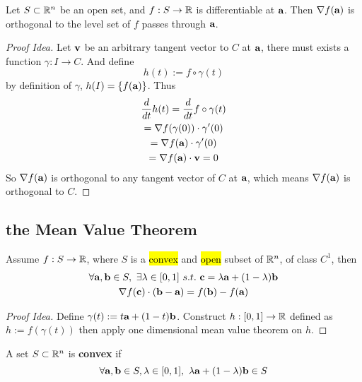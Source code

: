 \documentclass[11pt]{article}
\newcommand{\vea}[0]{\ve{a}}
\newcommand{\veb}[0]{\ve{b}}
\begin{document}
			\begin{theorem}
				Let $S \subset \mathbb{R}^n$ be an open set, and $f: S \to \mathbb{R}$ is differentiable at $\vea$. Then $\nabla f(\vea)$ is orthogonal to the level set of $f$ passes through $\vea$.
				\begin{proof}[Proof Idea]
					Let $\textbf{v}$ be an arbitrary tangent vector to $C$ at $\vea$, there must exists a function $\gamma: I \to C$. And define 
					\begin{equation}
						h(t) := f \circ \gamma (t)
					\end{equation}
					by definition of $\gamma$, $h(I) = \{f(\vea)\}$. Thus
					\begin{gather}
						\frac{d}{dt}h(t) = \frac{d}{dt} f \circ \gamma (t) \\
						= \nabla f (\gamma(0)) \cdot \gamma'(0) \\
						= \nabla f(\vea) \cdot \gamma'(0) \\
						= \nabla f(\vea) \cdot \ve{v} = 0
					\end{gather}
					So $\nabla f(\vea)$ is orthogonal to any tangent vector of $C$ at $\vea$, which means $\nabla f(\vea)$ is orthogonal to $C$.
				\end{proof}
			\end{theorem}
			
			
		\subsection{the Mean Value Theorem}
			\begin{theorem}
				Assume $f: S \to \mathbb{R}$, where $S$ is a \hl{convex} and \hl{open} subset of $\mathbb{R}^n$, of class $C^1$, then
				\begin{gather}
					\forall \vea, \veb \in S,\ \exists \lambda \in [0, 1]\ s.t.\ \ve{c} = \lambda \vea + (1 - \lambda) \veb \\
					\nabla f(\ve{c}) \cdot (\veb - \vea) = f(\veb) - f(\vea)
				\end{gather}
				\begin{proof}[Proof Idea]
					Define $\gamma(t) := t \vea + (1-t)\veb$.
					Construct $h: [0, 1] \to \mathbb{R}$ defined as $h := f(\gamma(t))$
					then apply one dimensional mean value theorem on $h$.
				\end{proof}
			\end{theorem}
			
			\begin{definition}
				A set $S \subset \mathbb{R}^n$ is \textbf{convex} if
				\begin{equation}
					\forall \vea, \veb \in S, \lambda \in [0, 1],\ \lambda \vea + (1 - \lambda) \veb \in S
				\end{equation}				
			\end{definition}
			
\end{document}
